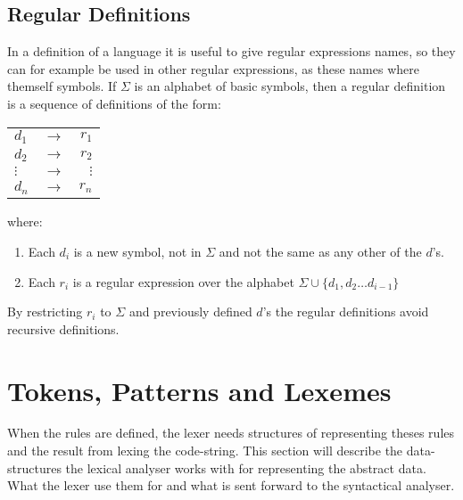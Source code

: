 \subsection{Regular Definitions}
In a definition of a language it is useful to give regular expressions names, 
so they can for example be used in other regular expressions, as these names 
where themself symbols. If $\Sigma$ is an alphabet of basic symbols, then a 
regular definition is a sequence of definitions of the form:
\begin{center}
\begin{tabular}{l c r}
$d_1$ & $\to$ & $r_1$\\
$d_2$ & $\to$ & $r_2$\\
$\vdots$ & $\to$ & $\vdots$\\
$d_n$ & $\to$ & $r_n$\\

\end{tabular}
\end{center}
where:
\begin{enumerate}
\item Each $d_i$ is a new symbol, not in $\Sigma$ and not the same as any other 
of the $d$'s.
\item Each $r_i$ is a regular expression over the alphabet $\Sigma  \cup \{d_1, 
d_2 \dots d_{i-1}\}$
\end{enumerate}
By restricting $r_i$ to $\Sigma$ and previously defined $d$'s the regular 
definitions avoid recursive definitions.  
\cite{Aho2006}

\section{Tokens, Patterns and Lexemes}
When the rules are defined, the lexer needs structures of representing theses 
rules and the result from lexing the code-string. This section will describe the 
data-structures the lexical analyser works with for representing the abstract 
data. What the lexer use them for and what is sent forward to the syntactical 
analyser. 

